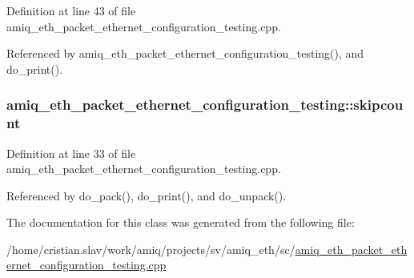 Definition at line 43 of file amiq\_\-eth\_\-packet\_\-ethernet\_\-configuration\_\-testing.cpp.

Referenced by amiq\_\-eth\_\-packet\_\-ethernet\_\-configuration\_\-testing(), and do\_\-print().\hypertarget{classamiq__eth__packet__ethernet__configuration__testing_a0e0c3dab008be4317aa19dfbe1a75be1}{
\subsubsection[{skipcount}]{ {\bf amiq\_\-eth\_\-packet\_\-ethernet\_\-configuration\_\-testing::skipcount}}}
\label{classamiq__eth__packet__ethernet__configuration__testing_a0e0c3dab008be4317aa19dfbe1a75be1}


Definition at line 33 of file amiq\_\-eth\_\-packet\_\-ethernet\_\-configuration\_\-testing.cpp.

Referenced by do\_\-pack(), do\_\-print(), and do\_\-unpack().

The documentation for this class was generated from the following file:\begin{DoxyCompactItemize}
\item 
/home/cristian.slav/work/amiq/projects/sv/amiq\_\-eth/sc/\hyperlink{amiq__eth__packet__ethernet__configuration__testing_8cpp}{amiq\_\-eth\_\-packet\_\-ethernet\_\-configuration\_\-testing.cpp}\end{DoxyCompactItemize}
